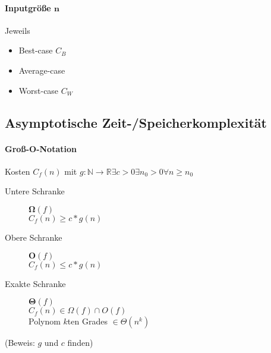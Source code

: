 \paragraph{Inputgrö\ss e $\mathbf{n}$} Jeweils

\begin{itemize}
  \item Best-case $C_B$

  \item Average-case

  \item Worst-case $C_W$
\end{itemize}

\subsection{Asymptotische Zeit-/Speicherkomplexität}

\paragraph{Gro\ss-O-Notation}
Kosten $C_f(n)$ mit $g: \mathbb{N} \rightarrow \mathbb{R} \exists c > 0 \exists n_0 > 0 \forall n \geq n_0$

\begin{description}
  \item [Untere Schranke] $\boldsymbol{\Omega} (f)$ \\
        $C_f(n) \boldsymbol{\geq} c * g(n)$

  \item [Obere Schranke] $\boldsymbol{O}(f)$ \\
        $C_f(n) \boldsymbol{\leq} c * g(n)$

  \item [Exakte Schranke] $\boldsymbol{\Theta} (f)$ \\
        $C_f(n) \in \Omega (f) \cap O(f)$ \\
        Polynom $k$ten Grades $\in \Theta (n^k)$
\end{description}

(Beweis: $g$ und $c$ finden)

